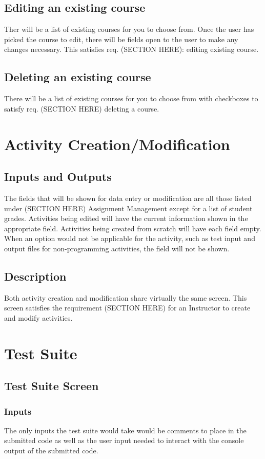 \documentclass{article}
\begin{document}
\subsection{Editing an existing course}
Ther will be a list of existing courses for you to choose from. Once the user has
picked the course to edit, there will be fields open to the user to make any
changes necessary. This satisfies req.
(SECTION HERE): editing existing course.

\subsection{Deleting an existing course}
There will be a list of existing courses for you to choose from with checkboxes
to satisfy req. (SECTION HERE) deleting a course.

\section{Activity Creation/Modification}
\subsection{Inputs and Outputs}
The fields that will be shown for data entry or modification are all those listed
under (SECTION HERE) Assignment Management except for a list of student grades.
Activities being edited will have the current information shown in the appropriate field.
Activities being created from scratch will have each field empty.
When an option would not be applicable for the activity, such as test input and output files
for non-programming activities, the field will not be shown.
\subsection{Description}
Both activity creation and modification share virtually the same screen.
This screen satisfies the requirement (SECTION HERE) for an Instructor to create and modify activities.

\section{Test Suite}
\subsection{Test Suite Screen}
\subsubsection{Inputs}
The only inputs the test suite would take would be comments to place in the submitted code as well as the user input needed to interact with the console output of the submitted code.
\end{document}
